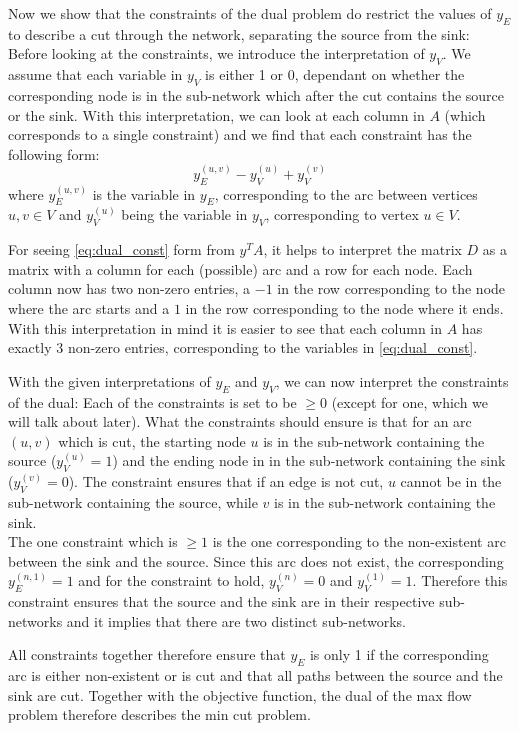 \documentclass[a4paper,12pt,headsepline]{scrartcl}
\begin{document}
\begin{enumerate}[a)]
    Now we show that the constraints of the dual problem do restrict the values of $y_E$ to describe a cut through the network, separating the source from the sink:
    Before looking at the constraints, we introduce the interpretation of $y_V$.
    We assume that each variable in $y_V$ is either 1 or 0, dependant on whether the corresponding node is in the sub-network which after the cut contains the source or the sink.
    With this interpretation, we can look at each column in $A$ (which corresponds to a single constraint) and we find that each constraint has the following form:
    \begin{equation}\label{eq:dual_const}
      y_E^{(u,v)} - y_V^{(u)} + y_V^{(v)}
    \end{equation}
    where $y_E^{(u,v)}$ is the variable in $y_E$, corresponding to the arc between vertices $u,v\in V$ and $y_V^{(u)}$ being the variable in $y_V$, corresponding to vertex $u\in V$.

    For seeing \eqref{eq:dual_const} form from $y^TA$, it helps to interpret the matrix $D$ as a matrix with a column for each (possible) arc and a row for each node.
    Each column now has two non-zero entries, a $-1$ in the row corresponding to the node where the arc starts and a $1$ in the row corresponding to the node where it ends.
    With this interpretation in mind it is easier to see that each column in $A$ has exactly 3 non-zero entries, corresponding to the variables in \eqref{eq:dual_const}.

    With the given interpretations of $y_E$ and $y_V$, we can now interpret the constraints of the dual:
    Each of the constraints is set to be $\ge 0$ (except for one, which we will talk about later).
    What the constraints should ensure is that for an arc $(u,v)$ which is cut, the starting node $u$ is in the sub-network containing the source ($y_V^{(u)}=1$) and the ending node in in the sub-network containing the sink ($y_V^{(v)}=0$).
    The constraint ensures that if an edge is not cut, $u$ cannot be in the sub-network containing the source, while $v$ is in the sub-network containing the sink. \\
    The one constraint which is $\ge 1$ is the one corresponding to the non-existent arc between the sink and the source.
    Since this arc does not exist, the corresponding $y_E^{(n,1)}=1$ and for the constraint to hold, $y_V^{(n)}=0$ and $y_V^{(1)}=1$.
    Therefore this constraint ensures that the source and the sink are in their respective sub-networks and it implies that there are two distinct sub-networks.

    All constraints together therefore ensure that $y_E$ is only 1 if the corresponding arc is either non-existent or is cut and that all paths between the source and the sink are cut.
    Together with the objective function, the dual of the max flow problem therefore describes the min cut problem.
\end{enumerate}
\end{document}
